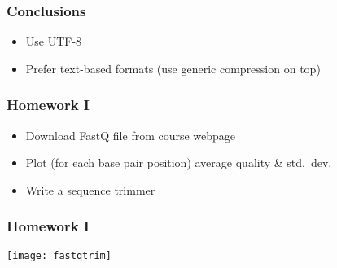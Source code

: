 \begin{frame}[fragile]
\frametitle{Conclusions}
\begin{itemize}
\item Use UTF-8
\item Prefer text-based formats (use generic compression on top)
\end{itemize}
\end{frame}

\begin{frame}[fragile]
\frametitle{Homework I}

\begin{itemize}
\item Download FastQ file from course webpage
\item Plot (for each base pair position) average quality \& std.\ dev.
\item Write a sequence trimmer
\end{itemize}
\end{frame}

\begin{frame}[fragile]
\frametitle{Homework I}

\centering
\texttt{[image: fastqtrim]}

\end{frame}


